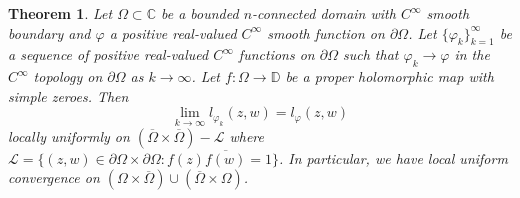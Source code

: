 \documentclass[11pt, reqno]{amsart}
\newtheorem{thm}{Theorem}[section]
\numberwithin{equation}{section}
\begin{document}
\begin{thm}\label{ram 3}
Let $\Omega\subset\mathbb{C}$ be a bounded $n$-connected domain with $C^{\infty}$ smooth boundary and $\varphi$ a positive real-valued $C^{\infty}$ smooth function on $\partial\Omega$. 
Let $\{\varphi_k\}_{k=1}^{\infty}$ be a sequence of positive real-valued $C^{\infty}$ functions on $\partial\Omega$ such that $\varphi_k\rightarrow\varphi$ in the $C^{\infty}$ topology on $\partial\Omega$ as $k\rightarrow\infty$. Let $f:\Omega\rightarrow\mathbb{D}$ be a proper holomorphic map with simple zeroes. Then 
\[
\lim_{k\rightarrow\infty}l_{\varphi_k}(z,w) = l_{\varphi}(z,w)
\]
locally uniformly on $(\overline{\Omega}\times\overline{\Omega})- \mathcal{L}$ where $\mathcal{L}=\{(z,w)\in\partial\Omega\times\partial\Omega : f(z) \overline{f(w)}=1\}$. In particular, we have local uniform convergence on $(\Omega\times\overline{\Omega})\cup(\overline{\Omega}\times\Omega)$.
\end{thm}
\end{document}

